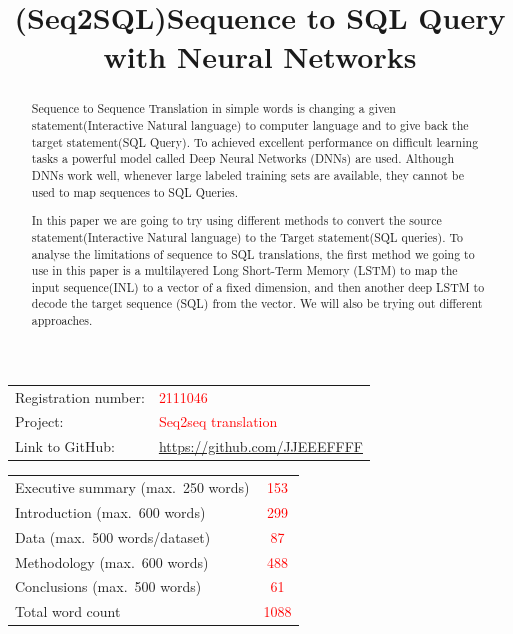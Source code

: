 \documentclass{article}
\title{(Seq2SQL)Sequence to SQL Query with Neural Networks}
\begin{document}
\maketitle

\begin{table}[h]
    \centering
    \begin{tabular}{ll}
        Registration number: & \textcolor{red}{2111046}\\
        Project: & \textcolor{red}{Seq2seq translation}\\
        Link to GitHub: & \url{https://github.com/JJEEEFFFF}\\
    \end{tabular}
\end{table}



\begin{table}[h]
    \centering
    \begin{tabular}{lc}
        Executive summary (max.\ 250 words) & \textcolor{red}{153}\\
        Introduction (max.\ 600 words) & \textcolor{red}{299}\\
        Data (max.\ 500 words/dataset) & \textcolor{red}{87}\\
        Methodology (max.\ 600 words) & \textcolor{red}{488}\\
        Conclusions (max.\ 500 words) & \textcolor{red}{61}\\
        \hline
        Total word count & \textcolor{red}{1088}\\
    \end{tabular}
\end{table}

\tableofcontents

\clearpage



\begin{abstract}
Sequence to Sequence Translation in simple words is changing a given statement(Interactive Natural language) to computer language and to give back the target statement(SQL Query). To achieved excellent performance on difficult learning tasks a powerful model called Deep Neural Networks (DNNs) are used. Although DNNs work well, whenever
large labeled training sets are available, they cannot be used to map sequences to
SQL Queries.

In this paper we are going to try using different methods to convert the source statement(Interactive Natural language) to the Target statement(SQL queries). To analyse the limitations of sequence to SQL translations, the first method we going to use in this paper is a multilayered Long Short-Term Memory (LSTM) to map the input sequence(INL)
to a vector of a fixed dimension, and then another deep LSTM to decode the
target sequence (SQL) from the vector. We will also be trying out different approaches.

\end{abstract}
\end{document}
